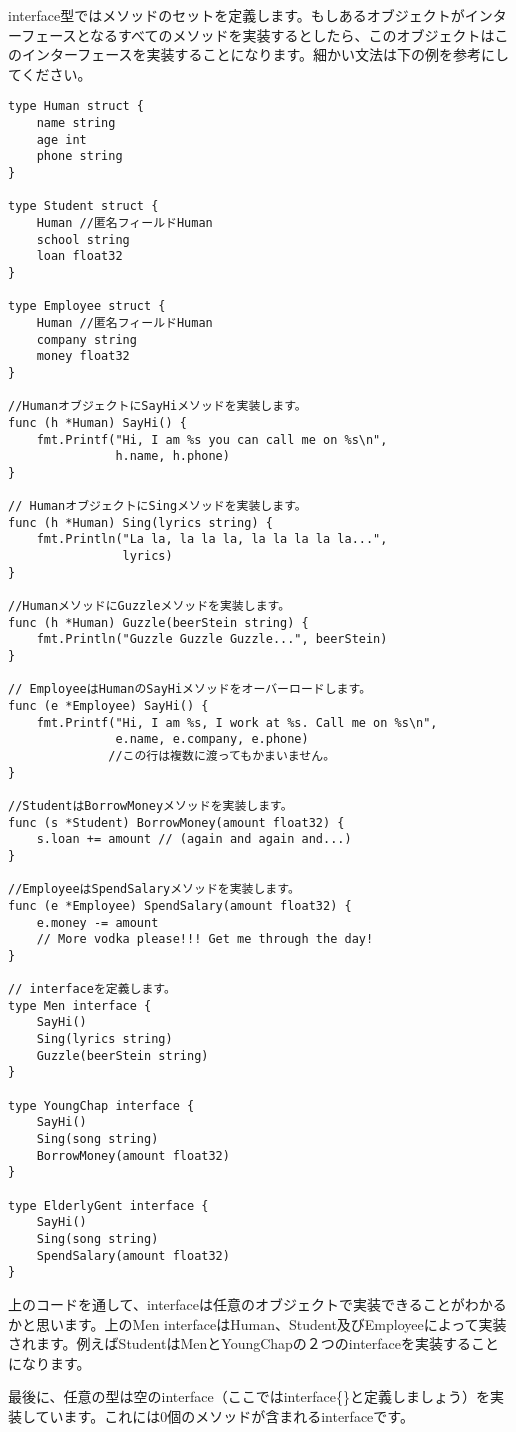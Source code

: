 interface型ではメソッドのセットを定義します。もしあるオブジェクトがインターフェースとなるすべてのメソッドを実装するとしたら、このオブジェクトはこのインターフェースを実装することになります。細かい文法は下の例を参考にしてください。

\begin{lstlisting}[numbers=none]
type Human struct {
    name string
    age int
    phone string
}

type Student struct {
    Human //匿名フィールドHuman
    school string
    loan float32
}

type Employee struct {
    Human //匿名フィールドHuman
    company string
    money float32
}

//HumanオブジェクトにSayHiメソッドを実装します。
func (h *Human) SayHi() {
    fmt.Printf("Hi, I am %s you can call me on %s\n",
               h.name, h.phone)
}

// HumanオブジェクトにSingメソッドを実装します。
func (h *Human) Sing(lyrics string) {
    fmt.Println("La la, la la la, la la la la la...",
                lyrics)
}

//HumanメソッドにGuzzleメソッドを実装します。
func (h *Human) Guzzle(beerStein string) {
    fmt.Println("Guzzle Guzzle Guzzle...", beerStein)
}

// EmployeeはHumanのSayHiメソッドをオーバーロードします。
func (e *Employee) SayHi() {
    fmt.Printf("Hi, I am %s, I work at %s. Call me on %s\n",
               e.name, e.company, e.phone)
              //この行は複数に渡ってもかまいません。
}

//StudentはBorrowMoneyメソッドを実装します。
func (s *Student) BorrowMoney(amount float32) {
    s.loan += amount // (again and again and...)
}

//EmployeeはSpendSalaryメソッドを実装します。
func (e *Employee) SpendSalary(amount float32) {
    e.money -= amount
    // More vodka please!!! Get me through the day!
}

// interfaceを定義します。
type Men interface {
    SayHi()
    Sing(lyrics string)
    Guzzle(beerStein string)
}

type YoungChap interface {
    SayHi()
    Sing(song string)
    BorrowMoney(amount float32)
}

type ElderlyGent interface {
    SayHi()
    Sing(song string)
    SpendSalary(amount float32)
}
\end{lstlisting}

上のコードを通して、interfaceは任意のオブジェクトで実装できることがわかるかと思います。上のMen interfaceはHuman、Student及びEmployeeによって実装されます。例えばStudentはMenとYoungChapの２つのinterfaceを実装することになります。

最後に、任意の型は空のinterface（ここではinterface\{\}と定義しましょう）を実装しています。これには0個のメソッドが含まれるinterfaceです。

